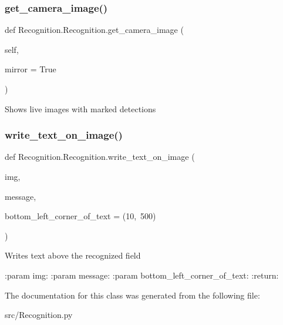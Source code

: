 \subsubsection{\texorpdfstring{get\+\_\+camera\+\_\+image()}{get\_camera\_image()}}
{\footnotesize\ttfamily def Recognition.\+Recognition.\+get\+\_\+camera\+\_\+image (\begin{DoxyParamCaption}\item[{}]{self,  }\item[{}]{mirror = {\ttfamily True} }\end{DoxyParamCaption})}

\begin{DoxyVerb}Shows live images with marked detections
\end{DoxyVerb}
 \mbox{\label{class_recognition_1_1_recognition_a5b3081b9a48c136f1397cd17dce89c37}} 
\subsubsection{\texorpdfstring{write\+\_\+text\+\_\+on\+\_\+image()}{write\_text\_on\_image()}}
{\footnotesize\ttfamily def Recognition.\+Recognition.\+write\+\_\+text\+\_\+on\+\_\+image (\begin{DoxyParamCaption}\item[{}]{img,  }\item[{}]{message,  }\item[{}]{bottom\+\_\+left\+\_\+corner\+\_\+of\+\_\+text = {\ttfamily (10,~500)} }\end{DoxyParamCaption})\hspace{0.3cm}{\ttfamily [static]}}

\begin{DoxyVerb}Writes text above the recognized field

:param img:
:param message:
:param bottom_left_corner_of_text:
:return:
\end{DoxyVerb}
 

The documentation for this class was generated from the following file\+:\begin{DoxyCompactItemize}
\item 
src/Recognition.\+py\end{DoxyCompactItemize}
